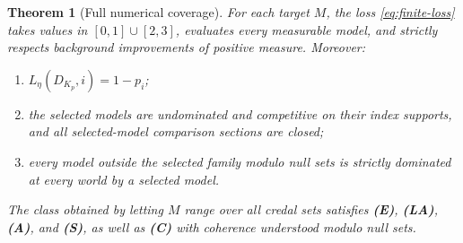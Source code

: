\documentclass[11pt]{article}
\newtheorem{theorem}{Theorem}
\theoremstyle{remark}
\begin{document}
\begin{theorem}[Full numerical coverage]\label{thm:numerical}
For each target $M$, the loss \eqref{eq:finite-loss} takes values in
$[0,1]\cup[2,3]$, evaluates every measurable model, and strictly respects
background improvements of positive measure. Moreover:
\begin{enumerate}[label=(\alph*)]
\item $L_\eta(D_{K_p},i)=1-p_i$;
\item the selected models are undominated and competitive on their index
supports, and all selected-model comparison sections are closed;
\item every model outside the selected family modulo null sets is strictly
dominated at every world by a selected model.
\end{enumerate}
The class obtained by letting $M$ range over all credal sets satisfies
\textbf{(E)}, \textbf{(LA)}, \textbf{(A)}, and \textbf{(S)}, as well as
\textbf{(C)} with coherence understood modulo null sets.
\end{theorem}
\end{document}
